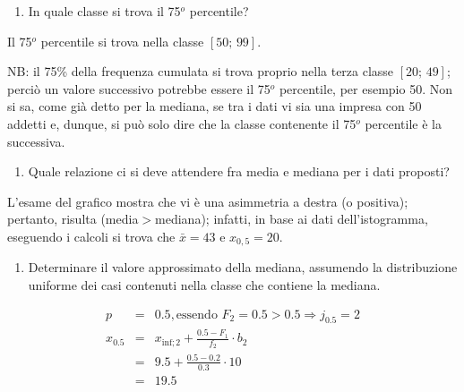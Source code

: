 \documentclass[
  11pt,
]{book}
\providecommand{\tightlist}{%
  \setlength{\itemsep}{0pt}\setlength{\parskip}{0pt}}
\theoremstyle{mytheoremstyle}
\theoremstyle{mydefstyle}
\newenvironment{sol}
  {
  \begin{tcolorbox}[enhanced,breakable,arc=0.1mm,boxrule=1pt,colback=white,colframe=iblue,
  title=\bf \fontfamily{lmss}\selectfont \hspace{.5 cm} Soluzione,drop fuzzy shadow]

}{
\end{tcolorbox}
  }
\begin{document}
\begin{enumerate}
\def\labelenumi{\alph{enumi}.}
\setcounter{enumi}{4}
\tightlist
\item
  In quale classe si trova il 75\(^{o}\) percentile?
\end{enumerate}

\begin{sol}
Il 75\(^{o}\) percentile si trova nella classe \([50;\, 99]\).

NB: il 75\% della frequenza cumulata si trova proprio nella terza
classe \([20;\, 49]\); perciò un valore successivo potrebbe essere
il 75\(^{o}\) percentile, per esempio 50.
Non si sa, come già detto per la mediana, se tra i dati vi sia
una impresa con 50 addetti e, dunque, si può solo dire che la
classe contenente il 75\(^{o}\) percentile è la successiva.

\end{sol}

\begin{enumerate}
\def\labelenumi{\alph{enumi}.}
\setcounter{enumi}{5}
\tightlist
\item
  Quale relazione ci si deve attendere
  fra media e mediana per i dati proposti?
\end{enumerate}

\begin{sol}
L'esame del grafico mostra che vi è una asimmetria a destra
(o positiva); pertanto, risulta (media\(>\)mediana); infatti, in
base ai dati dell'istogramma, eseguendo i calcoli si trova che
\(\bar{x}=43\) e \(x_{0,5}=20\).

\end{sol}

\begin{enumerate}
\def\labelenumi{\alph{enumi}.}
\setcounter{enumi}{6}
\tightlist
\item
  Determinare il valore approssimato della mediana,
  assumendo la distribuzione uniforme dei casi contenuti nella classe
  che contiene la mediana.
\end{enumerate}

\begin{sol}
\begin{eqnarray*}
  p &=&  0.5 , \text{essendo }F_{ 2 }= 0.5  > 0.5  \Rightarrow j_{ 0.5 }= 2 \\
  x_{ 0.5 } &=& x_{\text{inf}; 2 } + \frac{ { 0.5 } - F_{ 1 }} {f_{ 2 }} \cdot b_{ 2 } \\
            &=&  9.5  + \frac {{ 0.5 } -  0.2 } { 0.3 } \cdot  10  \\
            &=&  19.5 
\end{eqnarray*}

\end{sol}
\end{document}
